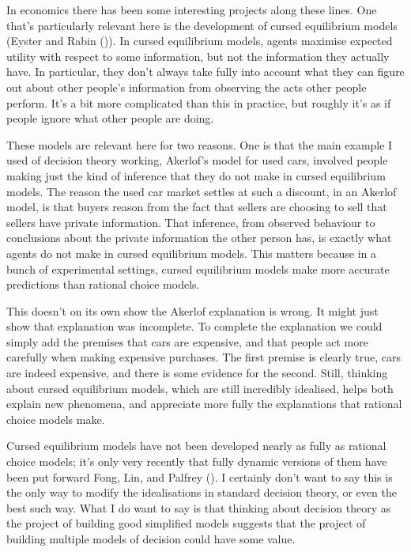\documentclass[
  11pt,
  letterpaper,
  DIV=11,
  numbers=noendperiod,
  twoside]{scrartcl}
\begin{document}
In economics there has been some interesting projects along these lines.
One that's particularly relevant here is the development of cursed
equilibrium models (Eyster and Rabin
()). In cursed equilibrium models,
agents maximise expected utility with respect to some information, but
not the information they actually have. In particular, they don't always
take fully into account what they can figure out about other people's
information from observing the acts other people perform. It's a bit
more complicated than this in practice, but roughly it's as if people
ignore what other people are doing.

These models are relevant here for two reasons. One is that the main
example I used of decision theory working, Akerlof's model for used
cars, involved people making just the kind of inference that they do not
make in cursed equilibrium models. The reason the used car market
settles at such a discount, in an Akerlof model, is that buyers reason
from the fact that sellers are choosing to sell that sellers have
private information. That inference, from observed behaviour to
conclusions about the private information the other person has, is
exactly what agents do not make in cursed equilibrium models. This
matters because in a bunch of experimental settings, cursed equilibrium
models make more accurate predictions than rational choice models.

This doesn't on its own show the Akerlof explanation is wrong. It might
just show that explanation was incomplete. To complete the explanation
we could simply add the premises that cars are expensive, and that
people act more carefully when making expensive purchases. The first
premise is clearly true, cars are indeed expensive, and there is some
evidence for the second. Still, thinking about cursed equilibrium
models, which are still incredibly idealised, helps both explain new
phenomena, and appreciate more fully the explanations that rational
choice models make.

Cursed equilibrium models have not been developed nearly as fully as
rational choice models; it's only very recently that fully dynamic
versions of them have been put forward Fong, Lin, and Palfrey
(). I certainly don't want to say
this is the only way to modify the idealisations in standard decision
theory, or even the best such way. What I do want to say is that
thinking about decision theory as the project of building good
simplified models suggests that the project of building multiple models
of decision could have some value.
\end{document}
